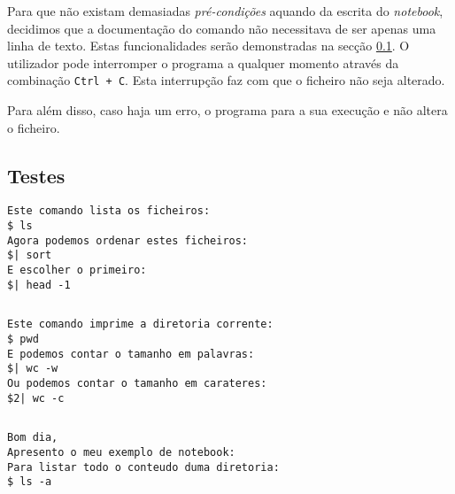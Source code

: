 \documentclass[a4paper]{article}
\begin{document}
Para que não existam demasiadas \textit{pré-condições} aquando da escrita do \textit{notebook}, decidimos que a documentação do 
comando não necessitava de ser apenas uma linha de texto.
Estas funcionalidades serão demonstradas na secção \ref{sec:testes}.
O utilizador pode interromper o programa a qualquer momento através da combinação \texttt{Ctrl + C}. Esta interrupção faz com que o 
ficheiro não seja alterado.

Para além disso, caso haja um erro, o programa para a sua execução e não altera o ficheiro.




\subsection{Testes}
\label{sec:testes}

\begin{lstlisting}[caption=1º Exemplo]
Este comando lista os ficheiros:
$ ls
Agora podemos ordenar estes ficheiros:
$| sort
E escolher o primeiro:
$| head -1
\end{lstlisting}

\begin{lstlisting}[caption=Resultado do 1º Exemplo]

\end{lstlisting}


\begin{lstlisting}[caption=2º Exemplo]
Este comando imprime a diretoria corrente:
$ pwd
E podemos contar o tamanho em palavras:
$| wc -w
Ou podemos contar o tamanho em carateres:
$2| wc -c
\end{lstlisting}


\begin{lstlisting}[caption=Resultado do 2º Exemplo]

\end{lstlisting}


\begin{lstlisting}[caption=3º Exemplo]
Bom dia,
Apresento o meu exemplo de notebook:
Para listar todo o conteudo duma diretoria:
$ ls -a
\end{lstlisting}


\begin{lstlisting}[caption=Resultado do 3º Exemplo]

\end{lstlisting}
\end{document}
